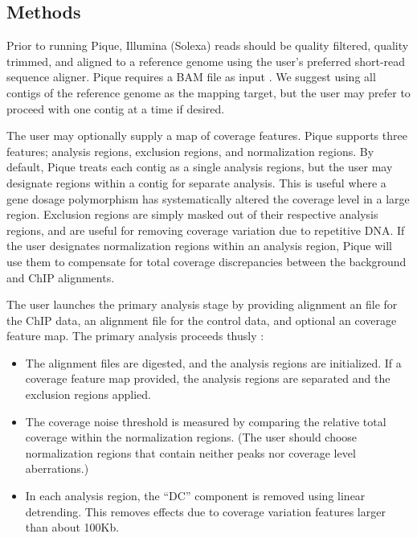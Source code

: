 \documentclass{bioinfo}
\begin{document}
\begin{methods}
\section{Methods}

\noindent Prior to running Pique, Illumina (Solexa) reads should be
quality filtered, quality trimmed, and aligned to a reference genome
using the user's preferred short-read sequence aligner. Pique requires
a BAM file as input \cite{sam_format}. We suggest using all contigs of
the reference genome as the mapping target, but the user may prefer to
proceed with one contig at a time if desired.

The user may optionally supply a map of coverage features. Pique
supports three features; analysis regions, exclusion regions, and
normalization regions. By default, Pique treats each contig as a
single analysis regions, but the user may designate regions within a
contig for separate analysis. This is useful where a gene dosage
polymorphism has systematically altered the coverage level in a large
region. Exclusion regions are simply masked out of their respective
analysis regions, and are useful for removing coverage variation due
to repetitive DNA. If the user designates normalization regions within
an analysis region, Pique will use them to compensate for total coverage
discrepancies between the background and ChIP alignments.

The user launches the primary analysis stage by providing alignment an
file for the ChIP data, an alignment file for the control data, and
optional an coverage feature map. The primary analysis proceeds thusly
:

\begin{itemize}

\item The alignment files are digested, and the analysis regions are
  initialized. If a coverage feature map provided, the analysis
  regions are separated and the exclusion regions applied.

\item The coverage noise threshold is measured by comparing the
  relative total coverage within the normalization regions. (The user
  should choose normalization regions that contain neither peaks nor
  coverage level aberrations.)

\item In each analysis region, the ``DC'' component is removed using
  linear detrending. This removes effects due to coverage variation
  features larger than about 100Kb.


\end{itemize}
\end{methods}
\end{document}
